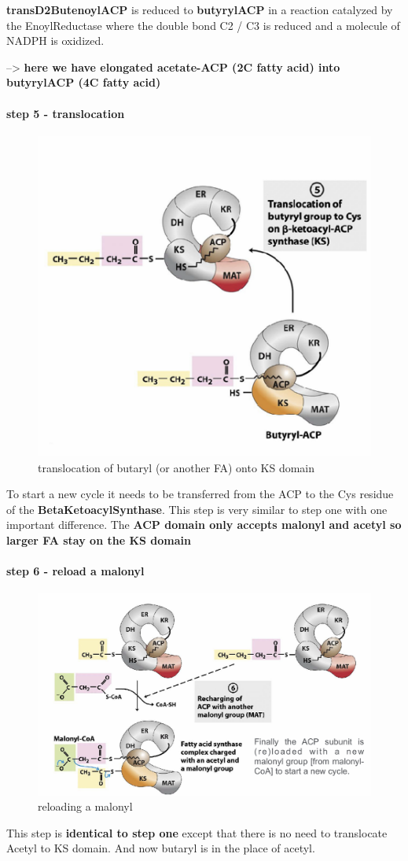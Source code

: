 \documentclass[../main.tex]{subfiles}
\begin{document}
\textbf{\gls{transD2ButenoylACP}} is reduced to \textbf{\gls{butyrylACP}} in a reaction catalyzed by the \gls{EnoylReductase} where the double bond C2 / C3 is reduced and a
molecule of NADPH is oxidized. 

--> \textbf{here we have elongated acetate-ACP (2C fatty acid) into butyrylACP (4C fatty acid)}

\paragraph{step 5 - translocation }
\begin{figure}[H]
    \centering
    \includegraphics[width=0.5\linewidth]{step5.png}
    \caption{translocation of butaryl (or another FA) onto KS domain}
    \label{fig:enter-label}
\end{figure}

 To start a new cycle it 
needs to be transferred from the 
ACP to the Cys residue of the \textbf{\gls{BetaKetoacylSynthase}}. This step is very similar to step one with one important difference. The \textbf{ACP domain only accepts malonyl and acetyl so larger FA stay on the KS domain}

\paragraph{step 6 - reload a malonyl}
\begin{figure}[H]
    \centering
    \includegraphics[width=0.5\linewidth]{step6.png}
    \caption{reloading a malonyl}
    \label{fig:enter-label}
\end{figure}
This step is \textbf{identical to step one} except that there is no need to translocate Acetyl to KS domain. And now butaryl is in the place of acetyl.
\end{document}
